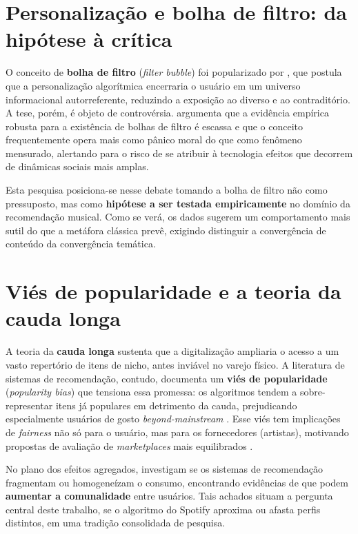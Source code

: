 \documentclass[12pt, %
openright,
oneside, %
a4paper,    %
english,   %
brazil]{facom-ufu-abntex2}
\begin{document}
\section{Personalização e bolha de filtro: da hipótese à crítica}

O conceito de \textbf{bolha de filtro} (\emph{filter bubble}) foi popularizado
por , que postula que a personalização algorítmica
encerraria o usuário em um universo informacional autorreferente, reduzindo a
exposição ao diverso e ao contraditório. A tese, porém, é objeto de
controvérsia.  argumenta que a evidência empírica
robusta para a existência de bolhas de filtro é escassa e que o conceito
frequentemente opera mais como pânico moral do que como fenômeno mensurado,
alertando para o risco de se atribuir à tecnologia efeitos que decorrem de
dinâmicas sociais mais amplas.

Esta pesquisa posiciona-se nesse debate tomando a bolha de filtro não como
pressuposto, mas como \textbf{hipótese a ser testada empiricamente} no domínio
da recomendação musical. Como se verá, os dados sugerem um comportamento mais
sutil do que a metáfora clássica prevê, exigindo distinguir a convergência de
conteúdo da convergência temática.

\section{Viés de popularidade e a teoria da cauda longa}

A teoria da \textbf{cauda longa} \cite{anderson2006longtail} sustenta que a
digitalização ampliaria o acesso a um vasto repertório de itens de nicho, antes
inviável no varejo físico. A literatura de sistemas de recomendação, contudo,
documenta um \textbf{viés de popularidade} (\emph{popularity bias}) que tensiona
essa promessa: os algoritmos tendem a sobre-representar itens já populares em
detrimento da cauda, prejudicando especialmente usuários de gosto
\emph{beyond-mainstream} \cite{bauer2019global,kowald2020unfairness}. Esse viés
tem implicações de \emph{fairness} não só para o usuário, mas para os
fornecedores (artistas), motivando propostas de avaliação de \emph{marketplaces}
mais equilibrados \cite{mehrotra2018towards}.

No plano dos efeitos agregados,  investigam se os
sistemas de recomendação fragmentam ou homogeneízam o consumo, encontrando
evidências de que podem \textbf{aumentar a comunalidade} entre usuários. Tais
achados situam a pergunta central deste trabalho, se o algoritmo do Spotify
aproxima ou afasta perfis distintos, em uma tradição consolidada de pesquisa.
\end{document}

